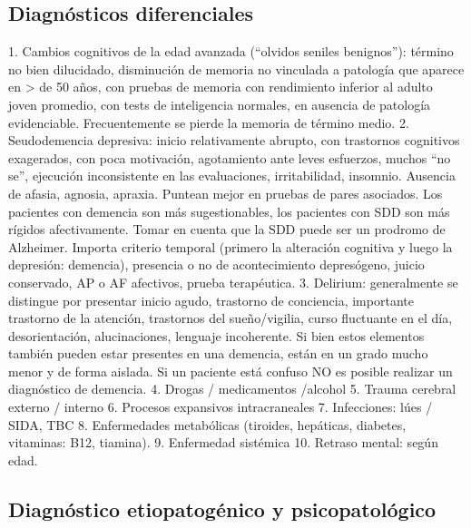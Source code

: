 \subsection*{Diagnósticos diferenciales}
1. Cambios cognitivos de la edad avanzada (“olvidos seniles benignos”): término no bien dilucidado, disminución de memoria no vinculada a patología que aparece en > de 50 años, con pruebas de memoria con rendimiento inferior al adulto joven promedio, con tests de inteligencia normales, en ausencia de patología evidenciable. Frecuentemente se pierde la memoria de término medio.
2. Seudodemencia depresiva: inicio relativamente abrupto, con trastornos cognitivos exagerados, con poca motivación, agotamiento ante leves esfuerzos, muchos “no se”, ejecución inconsistente en las evaluaciones, irritabilidad, insomnio. Ausencia de afasia, agnosia, apraxia. Puntean mejor en pruebas de pares asociados. Los pacientes con demencia son más sugestionables, los pacientes con SDD son más rígidos afectivamente. Tomar en cuenta que la SDD puede ser un prodromo de Alzheimer. Importa criterio temporal (primero la alteración cognitiva y luego la depresión: demencia), presencia o no de acontecimiento depresógeno, juicio conservado, AP o AF afectivos, prueba terapéutica.
3. Delirium: generalmente se distingue por presentar inicio agudo, trastorno de conciencia, importante trastorno de la atención, trastornos del sueño/vigilia, curso fluctuante en el día, desorientación, alucinaciones, lenguaje incoherente. Si bien estos elementos también pueden estar presentes en una demencia, están en un grado mucho menor y de forma aislada. Si un paciente está confuso NO es posible realizar un diagnóstico de demencia.
4. Drogas / medicamentos /alcohol
5. Trauma cerebral externo / interno
6. Procesos expansivos intracraneales
7. Infecciones: lúes / SIDA, TBC
8. Enfermedades metabólicas (tiroides, hepáticas, diabetes, vitaminas: B12, tiamina).
9. Enfermedad sistémica
10. Retraso mental: según edad.
\subsection*{Diagnóstico etiopatogénico y psicopatológico}
